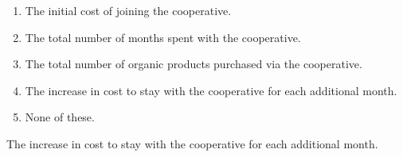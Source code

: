 \ifactodd
	\begin{enumerate}[label=\textbf{\Alph*.},itemsep=\fill,align=left]
		\item The initial cost of joining the cooperative.
		\item The total number of months spent with the cooperative.
		\item The total number of organic products purchased via the cooperative.
		\item The increase in cost to stay with the cooperative for each additional month. %
		\item None of these. 
	\end{enumerate}
\else
\fi

\ifgridin
 The increase in cost to stay with the cooperative for each additional month. %

\else
\fi

